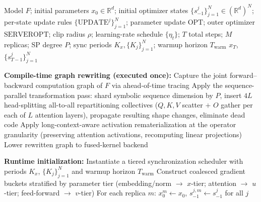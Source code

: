 \documentclass{article}
\begin{document}
\begin{algorithm}[t]
\caption{Neuron\_SP: Compiler-Orchestrated SP $+$ Desynced Low-Communication Training}
\label{alg:desloc}
\begin{algorithmic}[1]
\REQUIRE Model $F$; initial parameters $x_0 \in \mathbb{R}^d$;
  initial optimizer states $\{s^j_{-1}\}_{j=1}^N \in (\mathbb{R}^d)^N$;
  per-state update rules $\{\text{UPDATE}^j\}_{j=1}^N$;
  parameter update $\text{OPT}$; outer optimizer $\text{SERVEROPT}$;
  clip radius $\rho$; learning-rate schedule $\{\eta_t\}$;
  $T$ total steps; $M$ replicas; SP degree $P$;
  sync periods $K_x, \{K_j\}_{j=1}^N$; warmup horizon $T_{\mathrm{warm}}$
\ENSURE $x_T$, $\{s^j_{T-1}\}_{j=1}^N$

\medskip
\STATE \textbf{Compile-time graph rewriting (executed once):}
\STATE \hspace{1em} Capture the joint forward--backward computation graph of $F$
       via ahead-of-time tracing
\STATE \hspace{1em} Apply the sequence-parallel transformation pass:
       shard symbolic sequence dimension by $P$, insert $4L$ head-splitting
       all-to-all repartitioning collectives ($Q,K,V$ scatter $+$ $O$ gather
       per each of $L$ attention layers), propagate resulting shape changes,
       eliminate dead code
\STATE \hspace{1em} Apply long-context-aware activation rematerialization at the
       operator granularity (preserving attention activations, recomputing
       linear projections)
\STATE \hspace{1em} Lower rewritten graph to fused-kernel backend

\medskip
\STATE \textbf{Runtime initialization:}
\STATE \hspace{1em} Instantiate a tiered synchronization scheduler with periods
       $K_x$, $\{K_j\}_{j=1}^N$ and warmup horizon $T_{\mathrm{warm}}$
\STATE \hspace{1em} Construct coalesced gradient buckets stratified by parameter
       tier (embedding/norm $\to$ $x$-tier; attention $\to$ $u$-tier;
       feed-forward $\to$ $v$-tier)
\STATE \hspace{1em} For each replica $m$: $x^m_0 \gets x_0$,\;
       $s^{j,m}_{-1} \gets s^j_{-1}$ for all $j$


\end{algorithmic}
\end{algorithm}
\end{document}
